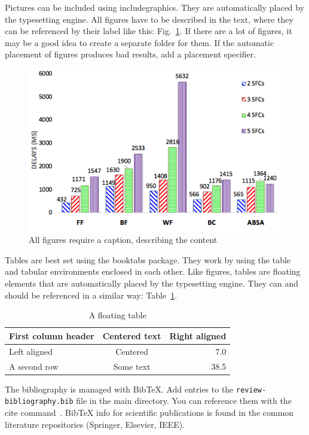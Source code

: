 \documentclass[11pt]{article} %
\begin{document}
Pictures can be included using includegraphics. They are automatically placed
by the typesetting engine. All figures have to be described in the text, where
they can be referenced by their label like this: Fig.~\ref{fig:myfig}. If there
are a lot of figures, it may be a good idea to create a separate folder for them.
If the automatic placement of figures produces bad results, add a placement
specifier.

\begin{figure}
	\centering
	\includegraphics[width=.8\linewidth]{DelayComp.png}
	\caption{All figures require a caption, describing the content}\label{fig:myfig}
\end{figure}

Tables are best set using the booktabs package. They work by using the
table and tabular environments enclosed in each other.
Like figures, tables are floating elements that are automatically placed
by the typesetting engine. They can and should be referenced in a similar
way: Table~\ref{tab:mytable}. 

\begin{table}[b]
	\centering %
\begin{tabular}{lcr} %
	\toprule
	First column header & Centered text & Right aligned \\
	\midrule
	Left aligned	& Centered &	7.0 \\
	A second row	& Some text &	38.5 \\
	\bottomrule
\end{tabular}
\caption{A floating table}%
\label{tab:mytable}
\end{table}

The bibliography is managed with BibTeX. Add entries to the \verb'review-bibliography.bib'
file in the main directory. You can reference them with the cite command~\cite{Guedes03:OCT}.
BibTeX info for scientific publications is found in the common literature repositories
(Springer, Elsevier, IEEE). 
\end{document}
